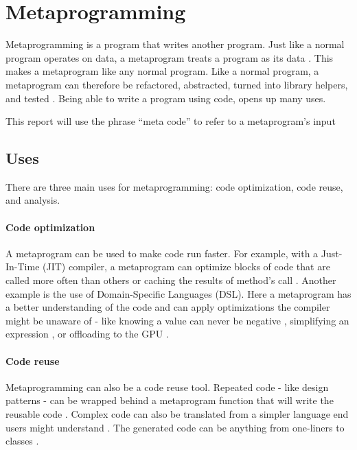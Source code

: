 \section{Metaprogramming}
Metaprogramming is a program that writes another program.
Just like a normal program operates on data, a metaprogram treats a program as its data \cite{savidis_19_01, anggoro_17_01, sheard_01_01}.
This makes a metaprogram like any normal program.
Like a normal program, a metaprogram can therefore be refactored, abstracted, turned into library helpers, and tested \cite{lilis_15_01}.
Being able to write a program using code, opens up many uses.

\begin{notebox}
	This report will use the phrase ``meta code'' to refer to a metaprogram's input
\end{notebox}


\subsection{Uses}
There are three main uses for metaprogramming: code optimization, code reuse, and analysis.

\paragraph{Code optimization}
A metaprogram can be used to make code run faster.
For example, with a Just-In-Time (JIT) compiler, a metaprogram can optimize blocks of code that are called more often than others \cite{hinsen_13_01} or caching the results of method's call \cite{seaton_15_01}.
Another example is the use of Domain-Specific Languages (DSL). 
Here a metaprogram has a better understanding of the code and can apply optimizations the compiler might be unaware of - like knowing a value can never be negative \cite{hinsen_13_01}, simplifying an expression \cite{sheard_01_01}, or offloading to the GPU \cite{videau_18_01}.

\paragraph{Code reuse}
Metaprogramming can also be a code reuse tool.
Repeated code - like design patterns \cite{lilis_15_01, alexandrescu_01_01} - can be wrapped behind a metaprogram function that will write the reusable code \cite{savidis_19_01, klabnik_2019_01}.
Complex code can also be translated from a simpler language end users might understand \cite{hinsen_13_01}.
The generated code can be anything from one-liners to classes \cite{savidis_19_01}.

